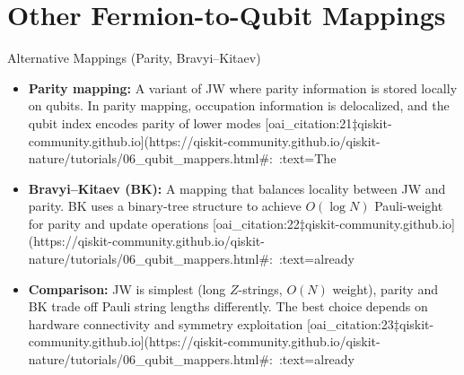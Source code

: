 \documentclass{beamer}
\begin{document}
\section{Other Fermion-to-Qubit Mappings}
\begin{frame}{Alternative Mappings (Parity, Bravyi–Kitaev)}
\begin{itemize}
  \item \textbf{Parity mapping:} A variant of JW where parity information is stored locally on qubits.  In parity mapping, occupation information is delocalized, and the qubit index encodes parity of lower modes [oai_citation:21‡qiskit-community.github.io](https://qiskit-community.github.io/qiskit-nature/tutorials/06_qubit_mappers.html#:~:text=The%
  \item \textbf{Bravyi–Kitaev (BK):} A mapping that balances locality between JW and parity.  BK uses a binary-tree structure to achieve $O(\log N)$ Pauli-weight for parity and update operations [oai_citation:22‡qiskit-community.github.io](https://qiskit-community.github.io/qiskit-nature/tutorials/06_qubit_mappers.html#:~:text=already%
  \item \textbf{Comparison:} 
  JW is simplest (long $Z$-strings, $O(N)$ weight), parity and BK trade off Pauli string lengths differently.  The best choice depends on hardware connectivity and symmetry exploitation [oai_citation:23‡qiskit-community.github.io](https://qiskit-community.github.io/qiskit-nature/tutorials/06_qubit_mappers.html#:~:text=already%
\end{itemize}
\end{frame}
\end{document}
